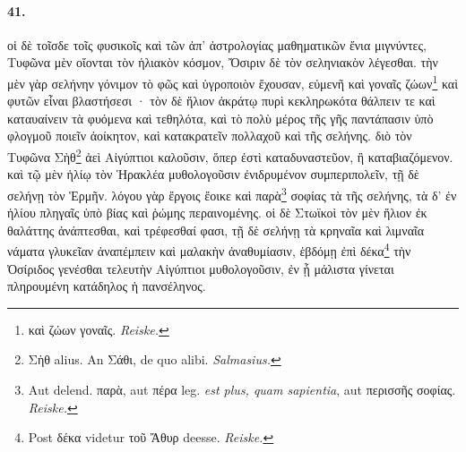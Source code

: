 \documentclass[a4paper, 11pt, oneside, polutonikogreek, german]{article}
\begin{document}
\paragraph{41.}
οἱ δὲ τοῖσδε τοῖς φυσικοῖς καὶ τῶν ἀπ' ἀστρολογίας μαθηματικῶν ἔνια μιγνύντες, Τυφῶνα μὲν οἴονται τὸν ἡλιακὸν κόσμον, Ὄσιριν δὲ τὸν σεληνιακὸν λέγεσθαι. τὴν μὲν γὰρ σελήνην γόνιμον τὸ φῶς καὶ ὑγροποιὸν ἔχουσαν, εὐμενῆ καὶ γοναῖς ζώων\footnote{καὶ ζώων γοναῖς. \emph{Reiske.}} καὶ φυτῶν εἶναι βλαστήσεσι · τὸν δὲ ἥλιον ἀκράτῳ πυρὶ κεκληρωκότα θάλπειν τε καὶ καταυαίνειν τὰ φυόμενα καὶ τεθηλότα, καὶ τὸ πολὺ μέρος τῆς γῆς παντάπασιν ὑπὸ φλογμοῦ ποιεῖν ἀοίκητον, καὶ κατακρατεῖν πολλαχοῦ καὶ τῆς σελήνης. διὸ τὸν Τυφῶνα Σὴθ\footnote{Σὴθ alius. An Σάθι, de quo alibi. \emph{Salmasius.}} ἀεὶ Αἰγύπτιοι καλοῦσιν, ὅπερ ἐστὶ καταδυναστεῦον, ἢ καταβιαζόμενον. καὶ τῷ μὲν ἡλίῳ τὸν Ἡρακλέα μυθολογοῦσιν ἐνιδρυμένον συμπεριπολεῖν, τῇ δὲ σελήνῃ τὸν Ἑρμῆν. λόγου γὰρ ἔργοις ἔοικε καὶ παρὰ\footnote{Aut delend. παρὰ, aut πέρα leg. \emph{est plus, quam sapientia}, aut περισσῆς σοφίας. \emph{Reiske.}} σοφίας τὰ τῆς σελήνης, τὰ δ' ἐν ἡλίου πληγαῖς ὑπὸ βίας καὶ ῥώμης περαινομένης. οἱ δὲ Στωϊκοὶ τὸν μὲν ἥλιον ἐκ θαλάττης ἀνάπτεσθαι, καὶ τρέφεσθαί φασι, τῇ δὲ σελήνῃ τὰ κρηναῖα καὶ λιμναῖα νάματα γλυκεῖαν ἀναπέμπειν καὶ μαλακὴν ἀναθυμίασιν, ἑβδόμῃ ἐπὶ δέκα\footnote{Post δέκα videtur τοῦ Ἄθυρ deesse. \emph{Reiske.}} τὴν Ὀσίριδος γενέσθαι τελευτὴν Αἰγύπτιοι μυθολογοῦσιν, ἐν ᾗ μάλιστα γίνεται πληρουμένη κατάδηλος ἡ πανσέληνος.
\end{document}
